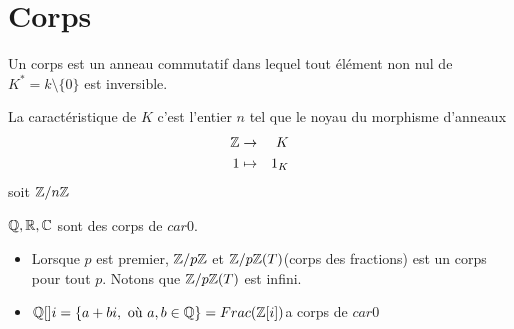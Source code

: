 \section{Corps}


\begin{definition}
	Un corps est un anneau commutatif dans lequel tout élément non nul de $K^* = k \setminus \{0\}$ est inversible.
\end{definition}

\begin{definition}
	La caractéristique de $K$ c'est l'entier $n$ tel que le noyau du morphisme d'anneaux
	\begin{eqnarray*}
		\mathbb{Z} &\to& K \\
		1 &\mapsto& 1_K
	\end{eqnarray*}
	soit $\mathbb{Z}/n\mathbb{Z}$
\end{definition}

\begin{example}
	$\mathbb{Q}, \mathbb{R}, \mathbb{C}$ sont des corps de $car 0$. \begin{itemize}
		\item Lorsque $p$ est premier, $\mathbb{Z}/p\mathbb{Z}$ et $\mathbb{Z}/p\mathbb{Z}(T)$(corps des fractions) est un corps pour tout $p$. Notons que $\mathbb{Z}/p\mathbb{Z}(T)$ est infini.
		\item $\mathbb{Q}[]i = \left\{ a + bi , \text{ où } a,b \in \mathbb{Q}\right\} = Frac (\mathbb{Z}[i])$a corps de $car 0$
	\end{itemize}
\end{example}


